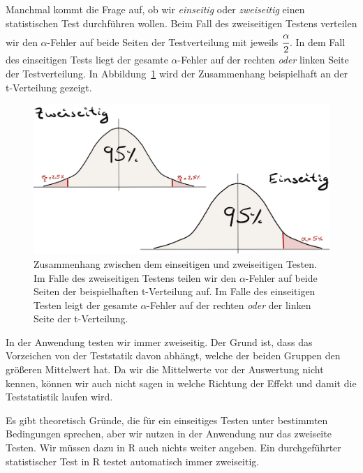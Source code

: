\documentclass[
  letterpaper,
]{scrbook}
\begin{document}
Manchmal kommt die Frage auf, ob wir \emph{einseitig} oder
\emph{zweiseitig} einen statistischen Test durchführen wollen. Beim Fall
des zweiseitigen Testens verteilen wir den \(\alpha\)-Fehler auf beide
Seiten der Testverteilung mit jeweils \(\cfrac{\alpha}{2}\). In dem Fall
des einseitigen Tests liegt der gesamte \(\alpha\)-Fehler auf der
rechten \emph{oder} linken Seite der Testverteilung. In
Abbildung~\ref{fig-teststatistik-02} wird der Zusammenhang beispielhaft
an der t-Verteilung gezeigt.

\begin{figure}

{\centering \includegraphics{./images/t-verteilung_02.png}

}

\caption{\label{fig-teststatistik-02}Zusammenhang zwischen dem
einseitigen und zweiseitigen Testen. Im Falle des zweiseitigen Testens
teilen wir den \(\alpha\)-Fehler auf beide Seiten der beispielhaften
t-Verteilung auf. Im Falle des einseitigen Testen leigt der gesamte
\(\alpha\)-Fehler auf der rechten \emph{oder} der linken Seite der
t-Verteilung.}

\end{figure}

{}

In der Anwendung testen wir immer zweiseitig. Der Grund ist, dass das
Vorzeichen von der Teststatik davon abhängt, welche der beiden Gruppen
den größeren Mittelwert hat. Da wir die Mittelwerte vor der Auswertung
nicht kennen, können wir auch nicht sagen in welche Richtung der Effekt
und damit die Teststatistik laufen wird.

Es gibt theoretisch Gründe, die für ein einseitiges Testen unter
bestimmten Bedingungen sprechen, aber wir nutzen in der Anwendung nur
das zweiseite Testen. Wir müssen dazu in R auch nichts weiter angeben.
Ein durchgeführter statistischer Test in R testet automatisch immer
zweiseitig.
\end{document}

